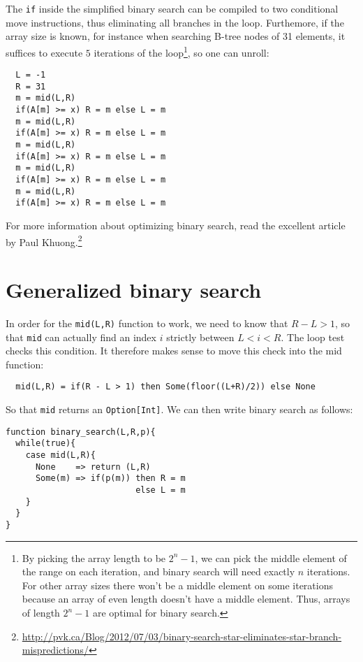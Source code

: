 \documentclass[a4paper, 11pt]{article}
\begin{document}
The \lstinline|if| inside the simplified binary search can be compiled to two conditional move instructions, thus eliminating all branches in the loop. Furthemore, if the array size is known, for instance when searching B-tree nodes of 31 elements, it suffices to execute $5$ iterations of the loop\footnote{By picking the array length to be $2^n - 1$, we can pick the middle element of the range on each iteration, and binary search will need exactly $n$ iterations. For other array sizes there won't be a middle element on some iterations because an array of even length doesn't have a middle element. Thus, arrays of length $2^n - 1$ are optimal for binary search.}, so one can unroll:

\begin{lstlisting}
  L = -1
  R = 31
  m = mid(L,R)
  if(A[m] >= x) R = m else L = m
  m = mid(L,R)
  if(A[m] >= x) R = m else L = m
  m = mid(L,R)
  if(A[m] >= x) R = m else L = m
  m = mid(L,R)
  if(A[m] >= x) R = m else L = m
  m = mid(L,R)
  if(A[m] >= x) R = m else L = m
\end{lstlisting}

\noindent For more information about optimizing binary search, read the excellent article by Paul Khuong.\footnote{\url{http://pvk.ca/Blog/2012/07/03/binary-search-star-eliminates-star-branch-mispredictions/}}

\section{Generalized binary search}

In order for the \lstinline|mid(L,R)| function to work, we need to know that $R-L>1$, so that \lstinline|mid| can actually find an index $i$ strictly between $L < i < R$. The loop test checks this condition. It therefore makes sense to move this check into the mid function:

\begin{lstlisting}
  mid(L,R) = if(R - L > 1) then Some(floor((L+R)/2)) else None
\end{lstlisting}

\noindent So that \lstinline|mid| returns an \lstinline|Option[Int]|. We can then write binary search as follows:

\begin{minipage}{\linewidth}
\begin{lstlisting}
function binary_search(L,R,p){
  while(true){
    case mid(L,R){
      None    => return (L,R)
      Some(m) => if(p(m)) then R = m
                          else L = m
    }
  }
}
\end{lstlisting}
\end{minipage}
\end{document}
